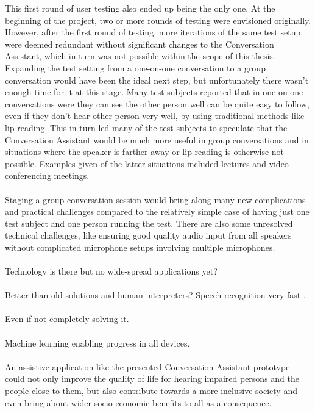 \documentclass[english, 12pt, a4paper, pdftex, elec, utf8]{aaltothesis}
\begin{document}
This first round of user testing also ended up being the only one. At the beginning of the project, two or more rounds of testing were envisioned originally. However, after the first round of testing, more iterations of the same test setup were deemed redundant without significant changes to the Conversation Assistant, which in turn was not possible within the scope of this thesis. Expanding the test setting from a one-on-one conversation to a group conversation would have been the ideal next step, but unfortunately there wasn't enough time for it at this stage. Many test subjects reported that in one-on-one conversations were they can see the other person well can be quite easy to follow, even if they don't hear other person very well, by using traditional methods like lip-reading. This in turn led many of the test subjects to speculate that the Conversation Assistant would be much more useful in group conversations and in situations where the speaker is farther away or lip-reading is otherwise not possible. Examples given of the latter situations included lectures and video-conferencing meetings. \\\\
Staging a group conversation session would bring along many new complications and practical challenges compared to the relatively simple case of having just one test subject and one person running the test. There are also some unresolved technical challenges, like ensuring good quality audio input from all speakers without complicated microphone setups involving multiple microphones. \\\\
Technology is there but no wide-spread applications yet? \\\\
Better than old solutions and human interpreters? Speech recognition very fast \cite{mcgraw2016personalized}. \\\\
Even if not completely solving it. \\\\
Machine learning enabling progress in all devices. \\\\
An assistive application like the presented Conversation Assistant prototype could not only improve the quality of life for hearing impaired persons and the people close to them, but also contribute towards a more inclusive society and even bring about wider socio-economic benefits to all as a consequence.
\end{document}
